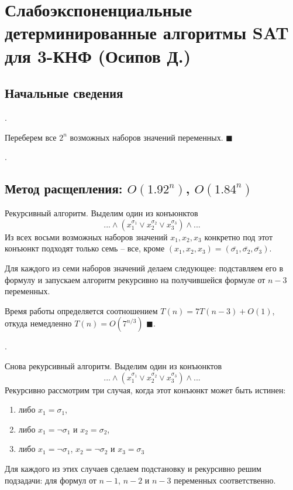 \hypertarget{3sat}{}
\section{Слабоэкспоненциальные детерминированные алгоритмы SAT для 3-КНФ (Осипов Д.)}
\subsection{Начальные сведения}
.

 Переберем все $2^n$ возможных наборов значений переменных. $\blacksquare$


.


\subsection{Метод расщепления: $O(1.92^n)$, $O(1.84^n)$}

Рекурсивный алгоритм. Выделим один из конъюнктов $$...\land(x_1^{\sigma_1} \lor x_2^{\sigma_2} \lor x_3^{\sigma_3})\land...$$ Из всех восьми возможных наборов значений $x_1, x_2, x_3$ конкретно под этот конъюнкт подходят только семь -- все, кроме $(x_1, x_2, x_3) = (\bar{\sigma_1}, \bar{\sigma_2}, \bar{\sigma_3})$. 

Для каждого из семи наборов значений делаем следующее: подставляем его в формулу и запускаем алгоритм рекурсивно на получившейся формуле от $n-3$ переменных.

Время работы определяется соотношением $T(n) = 7T(n-3) + O(1)$, откуда немедленно $T(n) = O(7^{n/3})$ $\blacksquare$.

\needpicture

. 

Снова рекурсивный алгоритм. Выделим один из конъюнктов $$...\land(x_1^{\sigma_1} \lor x_2^{\sigma_2} \lor x_3^{\sigma_3})\land...$$ Рекурсивно рассмотрим три случая, когда этот конъюнкт может быть истинен:
\begin{enumerate}
\item либо $x_1 = \sigma_1$,
\item либо $x_1 = \neg\sigma_1$ и $x_2 = \sigma_2$,
\item либо $x_1 = \neg\sigma_1$, $x_2 = \neg\sigma_2$ и $x_3 = \sigma_3$
\end{enumerate}
Для каждого из этих случаев сделаем подстановку и рекурсивно решим подзадачи: для формул от $n-1$, $n-2$ и $n-3$ переменных соответственно. 

